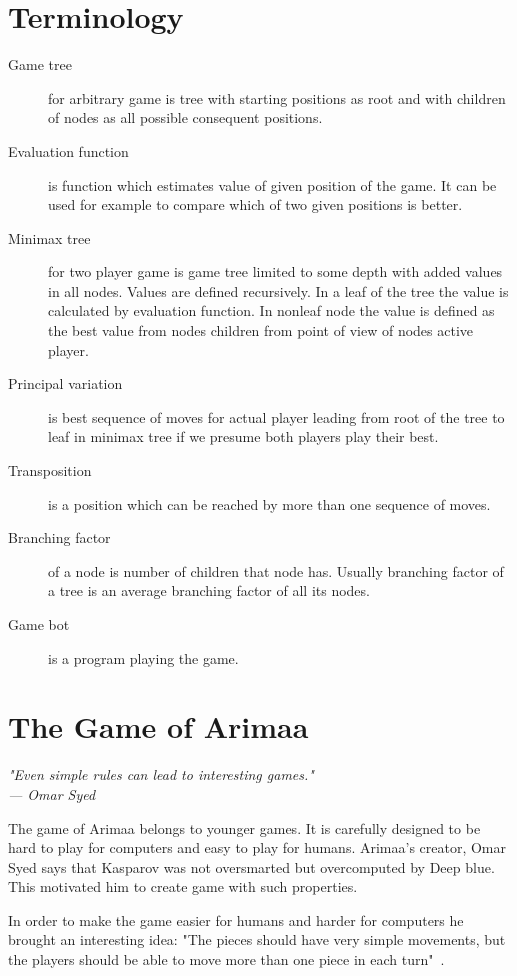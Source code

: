 \section{Terminology}
\begin{description}
\item[Game tree] for arbitrary game is tree with starting positions as root and
   with children of nodes as all possible consequent positions.
\item[Evaluation function] is function which estimates value of given position of the game. It can be used for example to compare which of two given positions is better.
\item[Minimax tree] for two player game is game tree limited to some depth with
added values in all nodes. Values are defined recursively. In a leaf of the tree
the value is calculated by evaluation function. In nonleaf node the value
is defined as the best value from nodes children from  point of view of nodes
active player.
\item[Principal variation] is best sequence of moves for actual player leading
from root of the tree to leaf in minimax tree if we presume both players play
their best.
\item[Transposition] is a position which can be reached by more than one
sequence of moves.
\item[Branching factor] of a node is number of children that node has. Usually
branching factor of a tree is an average branching factor of all its nodes.
\item[Game bot] is a program playing the game.
\end{description}

\section{The Game of Arimaa}
\begin{flushright}
\emph{"Even simple rules can lead to interesting games."\\
--- Omar Syed}
\end{flushright}

The game of Arimaa belongs to younger games. It is carefully designed to be
hard to play for computers and easy to play for humans. Arimaa's creator, Omar
Syed says that Kasparov was not oversmarted but overcomputed by Deep blue.
This motivated him to create game with such properties.

In order to make the game easier for humans and harder for computers he brought
an interesting idea: "The pieces should have very simple movements, but the
players should be able to move more than one piece in each
turn"~\cite{arimaa.com}.

